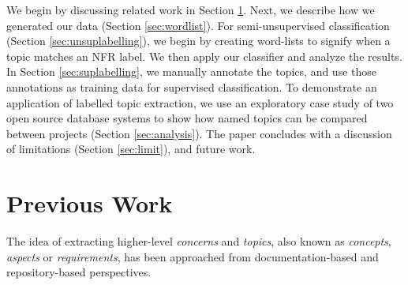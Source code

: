 \documentclass[smallextended]{svjour3}       %
\begin{document}
We begin by discussing related work in Section \ref{sec:related}.
Next, we describe how we generated our data (Section \ref{sec:wordlist}). For semi-unsupervised classification (Section \ref{sec:unsuplabelling}), we begin by creating word-lists to signify when a topic matches an NFR label. We then apply our classifier and analyze the results. %
In Section \ref{sec:suplabelling}, we manually annotate the topics, and use those annotations as training data for supervised classification.  
To demonstrate an application of labelled topic extraction, we use an exploratory case study of two open source database systems to show how named topics can be compared between projects  (Section \ref{sec:analysis}). 
The paper concludes with a discussion of limitations (Section \ref{sec:limit}), and future work.




\section{Previous Work}
\label{sec:related}

The idea of extracting higher-level \emph{concerns} and \emph{topics}, also known as
 \emph{concepts}, \emph{aspects} or \emph{requirements},
has been approached from documentation-based and repository-based
perspectives.
\end{document}
